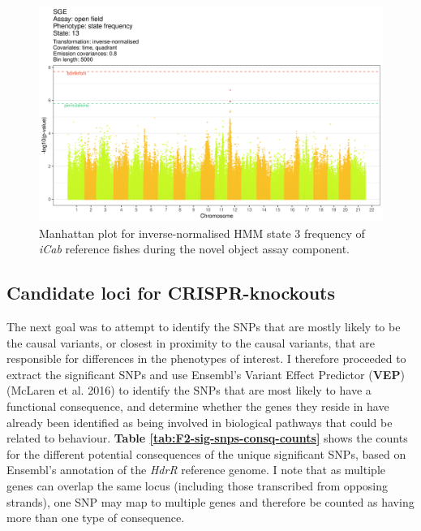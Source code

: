 \documentclass[
]{book}
\begin{document}
\begin{figure}
\includegraphics[width=1\linewidth]{figs/mikk_behaviour/manhattans/sge_of_13_time-quadrant} \caption{Manhattan plot for inverse-normalised HMM state 3 frequency of \emph{\textcolor{iCab_424B4D}{iCab}} reference fishes during the novel object assay component.}\label{fig:F2-man-sge-of-13}
\end{figure}

\hypertarget{candidate-loci-for-crispr-knockouts}{%
\subsection{Candidate loci for CRISPR-knockouts}\label{candidate-loci-for-crispr-knockouts}}

The next goal was to attempt to identify the SNPs that are mostly likely to be the causal variants, or closest in proximity to the causal variants, that are responsible for differences in the phenotypes of interest. I therefore proceeded to extract the significant SNPs and use Ensembl's Variant Effect Predictor (\textbf{VEP}) (McLaren et al. 2016) to identify the SNPs that are most likely to have a functional consequence, and determine whether the genes they reside in have already been identified as being involved in biological pathways that could be related to behaviour. \textbf{Table \ref{tab:F2-sig-snps-consq-counts}} shows the counts for the different potential consequences of the unique significant SNPs, based on Ensembl's annotation of the \emph{HdrR} reference genome. I note that as multiple genes can overlap the same locus (including those transcribed from opposing strands), one SNP may map to multiple genes and therefore be counted as having more than one type of consequence.
\end{document}
